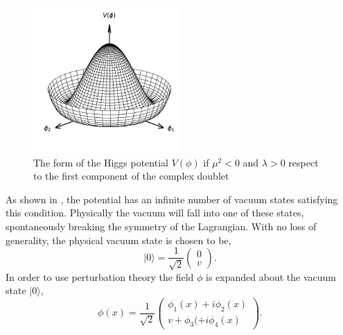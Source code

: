 \begin{figure}[h]
    \centering
    \includegraphics[width=0.5\textwidth]{Figures/standard_model/mexican_hat_potential}
    \caption{The form of the Higgs potential $V(\phi)$ if $\mu^2 < 0$ and $\lambda > 0$ respect to the first component of the complex doublet}
    \label{fig:mexican_hat}
\end{figure}

As shown in , the potential has an infinite number of vacuum states satisfying this condition.
Physically the vacuum will fall into one of these states, spontaneously breaking the symmetry of the Lagrangian.
With no loss of generality, the physical vacuum state is chosen to be,
\begin{equation}
    \label{eq:higgs_vacuum}
    | 0 \rangle	= \frac{1}{\sqrt{2}} \begin{pmatrix} 0 \\ v \end{pmatrix}.
\end{equation}
In order to use perturbation theory the field $\phi$ is expanded about the vacuum state $|0\rangle$,
\begin{equation}
    \phi(x) = \frac{1}{\sqrt{2}} \begin{pmatrix} \phi_1(x) + i \phi_2(x) \\ v + \phi_3( + i \phi_4(x) \end{pmatrix}.
\end{equation}

